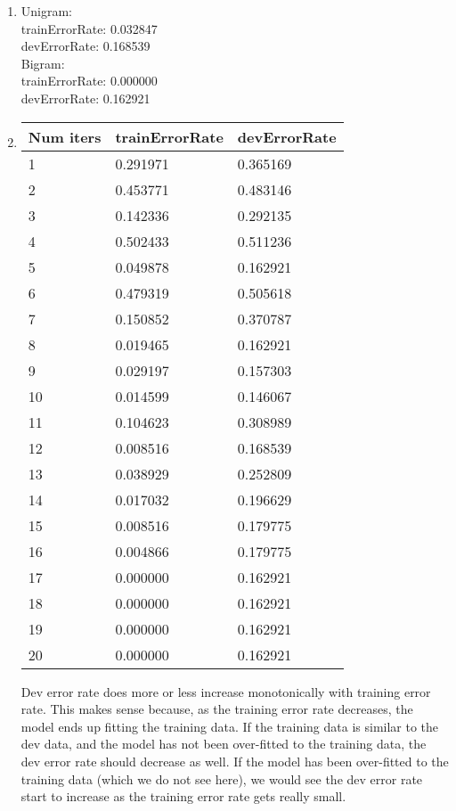 \documentclass[12pt]{article}
\begin{document}
\begin{enumerate}[label=(\alph*)]
  \item 
  Unigram:\\
  trainErrorRate: 0.032847\\
devErrorRate: 0.168539\\
  Bigram:\\
  trainErrorRate: 0.000000\\
  devErrorRate: 0.162921\\
  \item
  \begin{tabular}{ l | p{3cm} | p{3cm} }
    \hline
    Num iters & trainErrorRate & devErrorRate\\ \hline
1 & 
0.291971 & 0.365169 \\ \hline
2 & 
0.453771 & 0.483146 \\ \hline
3 & 
0.142336 & 0.292135 \\ \hline
4 & 
0.502433 & 0.511236 \\ \hline
5 & 
0.049878 & 0.162921 \\ \hline
6 & 
0.479319 & 0.505618 \\ \hline
7 & 
0.150852 & 0.370787 \\ \hline
8 & 
0.019465 & 0.162921 \\ \hline
9 & 
0.029197 & 0.157303 \\ \hline
10 & 
0.014599 & 0.146067 \\ \hline
11 & 
0.104623 & 0.308989 \\ \hline
12 & 
0.008516 & 0.168539 \\ \hline
13 & 
0.038929 & 0.252809 \\ \hline
14 & 
0.017032 & 0.196629 \\ \hline
15 & 
0.008516 & 0.179775 \\ \hline
16 & 
0.004866 & 0.179775 \\ \hline
17 & 
0.000000 & 0.162921 \\ \hline
18 & 
0.000000 & 0.162921 \\ \hline
19 & 
0.000000 & 0.162921 \\ \hline
20 & 
0.000000 & 0.162921 \\ \hline
  \end{tabular}

    Dev error rate does more or less increase monotonically with training error rate. This makes sense because, as the training error rate decreases, the model ends up fitting the training data. If the training data is similar to the dev data, and the model has not been over-fitted to the training data, the dev error rate should decrease as well. If the model has been over-fitted to the training data (which we do not see here), we would see the dev error rate start to increase as the training error rate gets really small. 

\end{enumerate}
\end{document}
